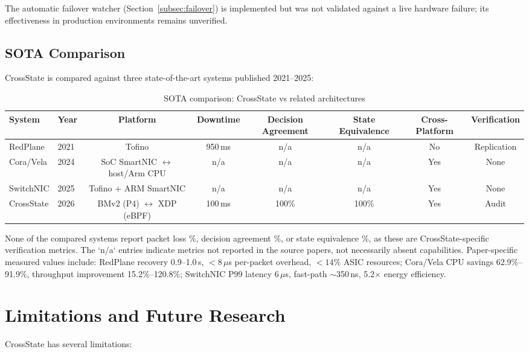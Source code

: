 \documentclass[10pt, conference, compsoc]{IEEEtran}
\begin{document}
The automatic failover watcher (Section~\ref{subsec:failover}) is implemented
but was not validated against a live hardware failure; its effectiveness in
production environments remains unverified.

\subsection{SOTA Comparison}
\label{subsec:sota}
CrossState is compared against three state-of-the-art systems published
2021--2025:

\begin{table}[htbp]
\centering
\footnotesize
\caption{SOTA comparison: CrossState vs related architectures}
\label{tab:sota}
\begin{tabular}{@{}llcccccc@{}}
\toprule
System & Year & Platform & Downtime & Decision Agreement & State Equivalence & Cross-Platform & Verification \\
\midrule
RedPlane & 2021 & Tofino & 950\,ms & n/a & n/a & No & Replication \\
Cora/Vela & 2024 & SoC SmartNIC $\leftrightarrow$ host/Arm CPU & n/a & n/a & n/a & Yes & None \\
SwitchNIC & 2025 & Tofino + ARM SmartNIC & n/a & n/a & n/a & Yes & None \\
CrossState & 2026 & BMv2 (P4) $\leftrightarrow$ XDP (eBPF) & 100\,ms & 100\% & 100\% & Yes & Audit \\
\bottomrule
\end{tabular}
\end{table}

None of the compared systems report packet loss \%, decision agreement \%, or
state equivalence \%, as these are CrossState-specific verification metrics.
The `n/a` entries indicate metrics not reported in the source papers, not
necessarily absent capabilities. Paper-specific measured values include:
RedPlane recovery 0.9--1.0\,s, $<8\,\mu$s per-packet overhead, $<14\%$ ASIC
resources; Cora/Vela CPU savings 62.9\%--91.9\%, throughput improvement
15.2\%--120.8\%; SwitchNIC P99 latency 6\,$\mu$s, fast-path $\sim$350\,ns,
5.2$\times$ energy efficiency.

\section{Limitations and Future Research}
\label{sec:limitations}
CrossState has several limitations:
\end{document}
